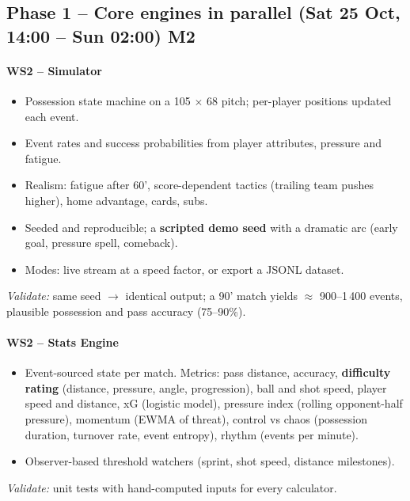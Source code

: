 \documentclass[11pt,a4paper]{article}
\begin{document}
\subsection[Phase 1 -- Core engines in parallel (Sat 25 Oct, 14:00 -- Sun 02:00)]{Phase 1 -- Core engines in parallel (Sat 25 Oct, 14:00 -- Sun 02:00) \hfill M2}

\paragraph{WS2 -- Simulator}
\begin{itemize}
  \item Possession state machine on a 105 $\times$ 68 pitch; per-player positions updated each event.
  \item Event rates and success probabilities from player attributes, pressure and fatigue.
  \item Realism: fatigue after 60', score-dependent tactics (trailing team pushes higher), home advantage, cards, subs.
  \item Seeded and reproducible; a \textbf{scripted demo seed} with a dramatic arc (early goal, pressure spell, comeback).
  \item Modes: live stream at a speed factor, or export a JSONL dataset.
\end{itemize}
\textit{Validate:} same seed $\rightarrow$ identical output; a 90' match yields $\approx$ 900--1\,400 events, plausible possession and pass accuracy (75--90\%).

\paragraph{WS2 -- Stats Engine}
\begin{itemize}
  \item Event-sourced state per match. Metrics: pass distance, accuracy, \textbf{difficulty rating}
        (distance, pressure, angle, progression), ball and shot speed, player speed and distance,
        xG (logistic model), pressure index (rolling opponent-half pressure), momentum (EWMA of threat),
        control vs chaos (possession duration, turnover rate, event entropy), rhythm (events per minute).
  \item Observer-based threshold watchers (sprint, shot speed, distance milestones).
\end{itemize}
\textit{Validate:} unit tests with hand-computed inputs for every calculator.
\end{document}
